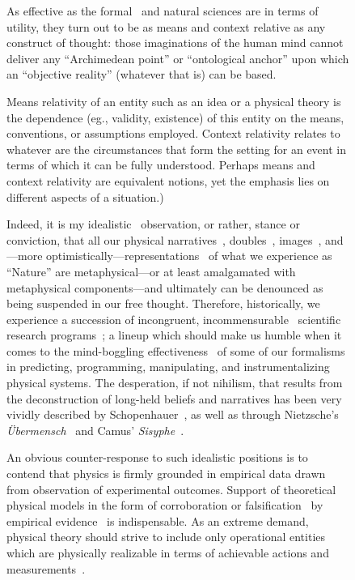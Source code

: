 \documentclass[entropy,article,accept,oneauthor,pdftex]{Definitions/mdpi}
\begin{document}
\begin{figure}[H]
As effective as the formal~\cite{wigner} and natural sciences are in terms of utility,
they turn out to be as means and context relative
as any construct of thought:
those imaginations of the human mind
cannot deliver any ``Archimedean point''
or ``ontological anchor'' upon which an ``objective reality''
(whatever that is) can be based.

Means relativity of an entity such as an idea
or a physical theory is
the dependence (eg., validity, existence) of this entity on the means, conventions, or assumptions employed.
Context relativity relates to whatever are the circumstances that form the setting for an event
in terms of which it can be fully understood.
Perhaps means and context relativity are equivalent notions, yet the emphasis lies on different aspects of a situation.)

Indeed, it is my idealistic~\cite{berkeley,stace,stace1,Goldschmidt2017-idealism} observation, or
rather, stance or conviction,
that all our physical narratives~\cite{descartes-meditation,Nietzsche-WahrheitLuege,derrida-Royle},
doubles~\cite{Arthaud,Arthaud-en}, images~\cite{hertz-94,hertz-94e}, and---more optimistically---representations~\cite{plato-republic}
of what we experience as ``Nature''
are metaphysical---or at least amalgamated with metaphysical components---and
ultimately can be denounced as being suspended in our free thought.
Therefore, historically, we experience a succession of incongruent, incommensurable~\cite{Feyerabend-62,fey-philpapers1,kuhn,Oberheim2005,sep-incommensurability,Pigliucci2018}
scientific research programs~\cite{lakatosch,lakatos_1978};
a lineup which should make us humble when it comes to the mind-boggling effectiveness~\cite{wigner} of some of our formalisms in predicting, programming,
manipulating, and instrumentalizing physical systems.
The desperation, if not
nihilism, that results from the deconstruction of long-held beliefs and narratives
has been very vividly described
by Schopenhauer~\cite{schopenhauer-dwawuv-VI},
as well as through Nietzsche's
{\it \"Ubermensch}~\cite{Nietzsche-ZarathustraI,Nietzsche-EcceHomo}
and Camus' {\it {S}isyphe}~\cite{camus-mos}.

An obvious counter-response to such idealistic positions is to contend that physics is firmly grounded in
empirical data drawn from observation of experimental outcomes.
Support of theoretical physical models in the form of corroboration or falsification~\cite{popper,popper-en}
by empirical evidence~\cite{sep-francis-bacon} is indispensable.
As an extreme demand, physical theory should strive to include only operational entities which are physically realizable
in terms of achievable actions and measurements~\cite{bridgman27,bridgman-1,bridgman-2,bridgman36,bridgman50,bridgman52}.


\end{figure}
\end{document}
